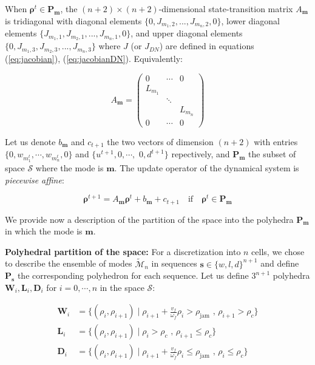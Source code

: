 \noindent When $\boldsymbol\rho^{t}\in\textbf{P}_{\boldsymbol m}$, the $(n+2)\times(n+2)$-dimensional state-transition matrix $A_{\boldsymbol m}$ is tridiagonal with diagonal elements $\{0, J_{m_{1},2},...,J_{m_{n},2},0\}$, lower diagonal elements $\{J_{m_{1},1},J_{m_{2},1},...,J_{m_{n},1},0\}$, and upper diagonal elements $\{0,J_{m_{1},3},J_{m_{2},3},...,J_{m_{n},3}\}$ where $J$ (or $J_{DN}$) are defined in equations (\ref{eq:jacobian}), (\ref{eq:jacobianDN}). Equivalently:

\begin{equation}\label{eq:matrixA}
 A_{\boldsymbol m} =
 \begin{pmatrix}
0 & \cdots & 0 \\
L_{m_{1}} & & \\
& \ddots & \\
& & L_{m_{n}}\\
0 & \cdots & 0
\end{pmatrix}
\end{equation}

\noindent Let us denote $b_{\boldsymbol m}$ and $c_{t+1}$ the two vectors of dimension $(n+2)$ with entries $\{0,w_{m^{t}_{1}},\cdots,w_{m^{t}_{n}},0\}$ and $\{u^{t+1},0,\cdots,$ $0,d^{t+1}\}$ repectively, and $\textbf{P}_{\boldsymbol m}$ the subset of space $\mathcal{S}$ where the mode is $\boldsymbol m$. The update operator of the dynamical system is \emph{piecewise affine}:

\begin{equation}
\boldsymbol\rho^{t+1} = A_{\boldsymbol m} \boldsymbol\rho^{t} + b_{\boldsymbol m} + c_{t+1} \quad\text{if}\quad\boldsymbol\rho^{t}\in\textbf{P}_{\boldsymbol m}
\label{eq:underlyingSystemDN2}
\end{equation}

\noindent We provide now a description of the partition of the space into the polyhedra $\textbf{P}_{\boldsymbol m}$ in which the mode is $\boldsymbol m$.

\hspace{10mm}

\noindent\textbf{Polyhedral partition of the space:} For a discretization into $n$ cells, we chose to describe the ensemble of modes $\tilde{\mathcal{M}}_{n}$ in sequences $\boldsymbol s \in \{w,l,d\}^{n+1}$ and define $\textbf{P}_{\boldsymbol s}$ the corresponding polyhedron for each sequence. Let us define $3^{n+1}$ polyhedra $\textbf{W}_{i}, \textbf{L}_{i}, \textbf{D}_{i}$ for $i=0,\cdots,n$ in the space $\mathcal{S}$:

\begin{equation}
\begin{array}{ll}
\textbf{W}_{i} & = \{(\rho_{i},\rho_{i+1}) \mid \rho_{i+1} + \frac{v_{f}}{\omega_{f}}\rho_{i} > \rho_{\text{jam}} \text{ ,   } \rho_{i+1} > \rho_{c}\}\\
\textbf{L}_{i} & = \{(\rho_{i},\rho_{i+1}) \mid \rho_{i} > \rho_{c} \text{ ,   } \rho_{i+1} \leq \rho_{c}\}\\
\textbf{D}_{i} & = \{(\rho_{i},\rho_{i+1}) \mid \rho_{i+1} + \frac{v_{f}}{\omega_{f}}\rho_{i} \leq \rho_{\text{jam}} \text{ ,   } \rho_{i} \leq \rho_{c}\}
\end{array}
\label{eq:regions3}
\end{equation}

